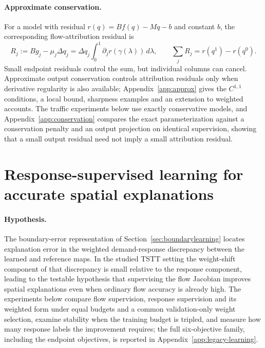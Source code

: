 \documentclass[a4paper,fleqn]{cas-sc}
\begin{document}
\paragraph{Approximate conservation.}
For a model with residual $r(q)=Bf(q)-Mq-b$ and constant $b$, the
corresponding flow-attribution residual is
\begin{equation}
R_j:=Bg_j-\mu_j\Delta q_j
=\Delta q_j\int_0^1\partial_jr(\gamma(\lambda))\,d\lambda,
\qquad \sum_jR_j=r(q^1)-r(q^0).
\label{eq:residualidentity}
\end{equation}
Small endpoint residuals control the sum, but individual columns can cancel.
Approximate output conservation controls attribution residuals only when
derivative regularity is also available; Appendix~\ref{app:approx} gives
the $C^{1,1}$ conditions, a local bound, sharpness examples and an
extension to weighted accounts. The traffic experiments below use exactly
conservative models, and Appendix~\ref{app:conservation} compares the
exact parameterization against a conservation penalty and an output
projection on identical supervision, showing that a small output
residual need not imply a small attribution residual.






\FloatBarrier
\section{Response-supervised learning for accurate spatial explanations}\label{sec:pairresults}
\paragraph{Hypothesis.}
The boundary-error representation of
Section~\ref{sec:boundarylearning} locates explanation error in the
weighted demand-response discrepancy between the learned and reference
maps. In the studied TSTT setting the weight-shift component of that
discrepancy is small relative to the response component, leading to the
testable hypothesis that supervising the flow Jacobian improves
spatial explanations even when ordinary flow accuracy is already high.
The experiments below compare flow supervision, response supervision
and its weighted form under equal budgets and a common validation-only
weight selection, examine stability when the training budget is
tripled, and measure how many response labels the improvement requires;
the full six-objective family, including the endpoint objectives, is
reported in Appendix~\ref{app:legacy-learning}.
\end{document}
